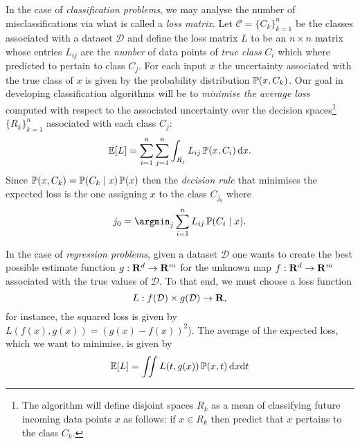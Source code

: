 In the case of \emph{classification problems}, we may analyse the number of
misclassifications via what is called a \emph{loss matrix}. Let
\(\mathcal{C} = \{C_k\}_{k=1}^n\) be the classes associated with a dataset
\(\mathcal{D}\) and define the loss matrix \(L\) to be an \(n \times n\) matrix
whose entries \(L_{i j}\) are the \emph{number} of data points of \emph{true
  class} \(C_i\) which where predicted to pertain to class \(C_j\). For each
input \(x\) the uncertainty associated with the true class of \(x\) is given by
the probability distribution \(\operatorname{\mathbb{P}}(x, C_k)\). Our goal in developing
classification algorithms will be to \emph{minimise the average loss} computed
with respect to the associated uncertainty over the decision spaces\footnote{The
algorithm will define disjoint spaces \(R_k\) as a mean of classifying future
incoming data points \(x\) as follows: if \(x \in R_k\) then predict that \(x\)
pertains to the class \(C_k\).}
\(\{R_k\}_{k=1}^n\) associated with each class \(C_j\):
\[
\operatorname{\mathbb{E}}[L] = \sum_{i=1}^n \sum_{j=1}^n \int_{R_j} L_{i j} \operatorname{\mathbb{P}}(x, C_i)\, \mathrm{d} x.
\]
Since \(\operatorname{\mathbb{P}}(x, C_k) = \operatorname{\mathbb{P}}(C_k \mid x) \operatorname{\mathbb{P}}(x)\) then the \emph{decision
  rule} that minimises the expected loss is the one assigning \(x\) to the class
\(C_{j_0}\) where
\[
j_0 = \argmin_j \sum_{i=1}^n L_{i j} \Prob(C_i \mid x).
\]

In the case of \emph{regression problems}, given a dataset \(\mathcal{D}\) one
wants to create the best possible estimate function \(g: \mathbf{R}^d \to \mathbf{R}^m\) for the
unknown map \(f: \mathbf{R}^d \to \mathbf{R}^m\) associated with the true values of
\(\mathcal{D}\). To that end, we must choose a loss function
\[
L: f(\mathcal{D}) \times g(\mathcal{D}) \to \mathbf{R},
\]
for instance, the squared loss is given by \(L(f(x), g(x)) = (g(x) -
f(x))^2\)). The average of the expected loss, which we want to minimise, is
given by
\[
\operatorname{\mathbb{E}}[L] = \iint L(t, g(x)) \operatorname{\mathbb{P}}(x, t)\, \mathrm{d} x \mathrm{d} t
\]



